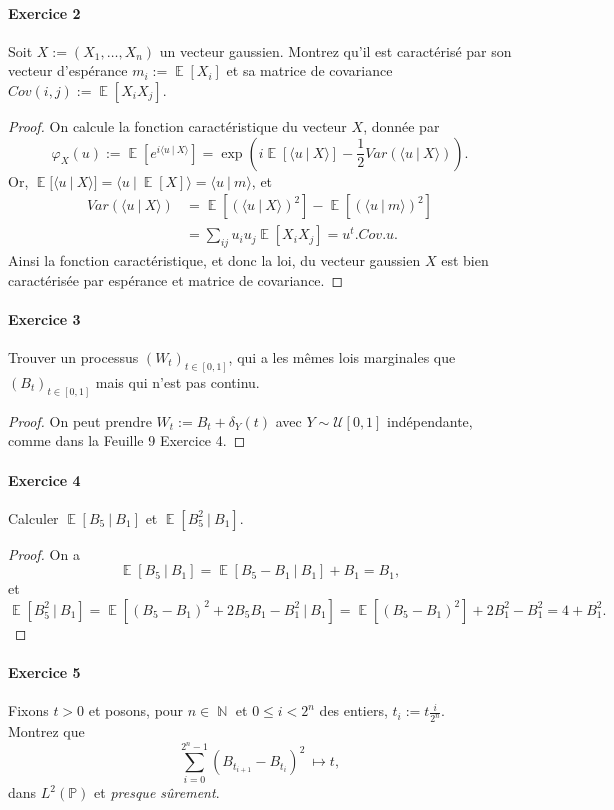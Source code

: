 \documentclass{article}
\theoremstyle{definition}
\numberwithin{equation}{section}
\DeclareMathOperator{\N}{\mathbb{N}}
\DeclareMathOperator{\E}{\mathbb{E}}
\begin{document}
\paragraph{Exercice 2}
Soit $X:=(X_1,\dots,X_n)$ un vecteur gaussien. Montrez qu'il est caractérisé par son vecteur d'espérance $m_i:=\E[X_i]$ et sa matrice de covariance $Cov(i,j):=\E[X_iX_j]$.

\begin{proof}
On calcule la fonction caractéristique du vecteur $X$, donnée par
$$\varphi_X(u):=\E\left[e^{i\langle u~|~X\rangle}\right] = \exp\left( i\E[\langle u~|~X\rangle] - \dfrac{1}{2}Var(\langle u~|~X\rangle) \right).$$
Or, $\E[\langle u~|~X\rangle] = \langle u~|~\E[X]\rangle = \langle u~|~m\rangle$, et 
\begin{align*}
Var(\langle u~|~X\rangle) &= \E\left[ (\langle u~|~X\rangle)^2 \right]-\E[(\langle u~|~m\rangle)^2] \\
&= \sum_{ij}u_iu_j\E[X_iX_j]=u^t.Cov.u.
\end{align*}
Ainsi la fonction caractéristique, et donc la loi, du vecteur gaussien $X$ est bien caractérisée par espérance et matrice de covariance.
\end{proof}

\paragraph{Exercice 3}
Trouver un processus $(W_t)_{t\in[0,1]}$, qui a les mêmes lois marginales que $(B_t)_{t\in[0,1]}$ mais qui n'est pas continu.

\begin{proof}
On peut prendre $W_t := B_t + \delta_Y(t)$ avec $Y\sim\mathcal{U}[0,1]$ indépendante, comme dans la Feuille 9 Exercice 4.
\end{proof}

\paragraph{Exercice 4}
Calculer $\E[B_5~|~B_1]$ et $\E[B_5^2~|~B_1]$.

\begin{proof}
On a $$\E[B_5~|~B_1]=\E[B_5-B_1~|~B_1]+B_1=B_1,$$
et
$$\E[B_5^2~|~B_1]=\E[(B_5-B_1)^2+2B_5B_1-B_1^2~|~B_1]=\E[(B_5-B_1)^2]+2B_1^2-B_1^2=4+B_1^2.$$
\end{proof}


\paragraph{Exercice 5}
Fixons $t>0$ et posons, pour $n\in\N$ et $0\leq i < 2^n$ des entiers, $t_i:=t\frac{i}{2^n}$.\\
Montrez que
$$\sum_{i=0}^{2^n-1} (B_{t_{i+1}}-B_{t_i})^2 ~\mapsto t,$$
dans $L^2(\mathbb{P})$ et \textit{presque sûrement}.
\end{document}
